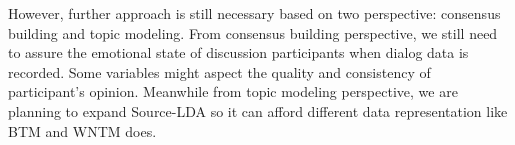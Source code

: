 \documentclass[10pt, conference, compsocconf]{IEEEtran}
\begin{document}
However, further approach is still necessary based on two perspective: consensus building and topic modeling. From consensus building perspective, we still need to assure the emotional state of discussion participants when dialog data is recorded. Some variables might aspect the quality and consistency of participant's opinion. Meanwhile from topic modeling perspective, we are planning to expand Source-LDA so it can afford different data representation like BTM and WNTM does.

%
%



%
%
\end{document}
